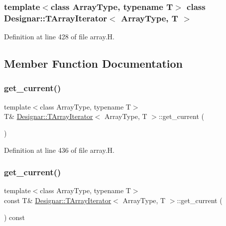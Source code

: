 \subsubsection*{template$<$class Array\+Type, typename T$>$\newline
class Designar\+::\+T\+Array\+Iterator$<$ Array\+Type, T $>$}



Definition at line 428 of file array.\+H.



\subsection{Member Function Documentation}
\mbox{\label{class_designar_1_1_t_array_iterator_a1d627df3d5e97047d904e743ccab0731}} 
\subsubsection{\texorpdfstring{get\+\_\+current()}{get\_current()}\hspace{0.1cm}{\footnotesize\ttfamily [1/2]}}
{\footnotesize\ttfamily template$<$class Array\+Type, typename T$>$ \\
T\& \hyperlink{class_designar_1_1_t_array_iterator}{Designar\+::\+T\+Array\+Iterator}$<$ Array\+Type, T $>$\+::get\+\_\+current (\begin{DoxyParamCaption}{ }\end{DoxyParamCaption})\hspace{0.3cm}{\ttfamily [inline]}}



Definition at line 436 of file array.\+H.

\mbox{\label{class_designar_1_1_t_array_iterator_ab7f3127bd70958a362a18f91a199a72b}} 
\subsubsection{\texorpdfstring{get\+\_\+current()}{get\_current()}\hspace{0.1cm}{\footnotesize\ttfamily [2/2]}}
{\footnotesize\ttfamily template$<$class Array\+Type, typename T$>$ \\
const T\& \hyperlink{class_designar_1_1_t_array_iterator}{Designar\+::\+T\+Array\+Iterator}$<$ Array\+Type, T $>$\+::get\+\_\+current (\begin{DoxyParamCaption}{ }\end{DoxyParamCaption}) const\hspace{0.3cm}{\ttfamily [inline]}}



